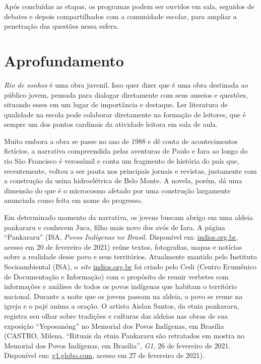 \documentclass[12pt]{extarticle}
\begin{document}
  Após concluídas as etapas, os programas podem ser ouvidos em sala,
  seguidos de debates e depois compartilhados com a comunidade escolar,
  para ampliar a penetração das questões nessa esfera.

  \section{Aprofundamento}

  \emph{Rio de sonhos} é uma obra juvenil. Isso quer dizer que é uma
  obra destinada ao público jovem, pensada para dialogar diretamente com
  seus anseios e questões, situando esses em um lugar de importância e
  destaque. Ler literatura de qualidade na escola pode colaborar
  diretamente na formação de leitores, que é sempre um dos pontos
  cardinais da atividade leitora em sala de aula.

  Muito embora a obra se passe no ano de 1988 e dê conta de
  acontecimentos fictícios, a narrativa compreendida pelas aventuras de
  Paulo e Iara ao longo do rio São Francisco é verossímil e conta um
  fragmento de história do país que, recentemente, voltou a ser pauta
  nos principais jornais e revistas, justamente com a construção da
  usina hidroelétrica de Belo Monte. A novela, porém, dá uma dimensão do
  que é o microcosmo afetado por uma construção largamente anunciada
  como feita em nome do progresso.

  Em determinado momento da narrativa, os jovens buscam abrigo em uma
  aldeia pankararu e conhecem Juca, filho mais novo dos avós de Iara. A
  página ``Pankararu'' (ISA, \emph{Povos Indígenas no Brasil.}
  Disponível em:
  \href{https://www.indios.org.br/pt/Povo:Pankararu}{indios.org.br},
  acesso em 20 de fevereiro de 2021) reúne textos, fotografias, mapas e
  notícias sobre a realidade desse povo e seus territórios. Atualmente
  mantido pelo Instituto Socioambiental (ISA), o \emph{site}
  \href{https://www.indios.org.br/}{indios.org.br}
  foi criado pelo Cedi (Centro Ecumênico de Documentação e Informação)
  com o propósito de reunir verbetes com informações e análises de todos
  os povos indígenas que habitam o território nacional. Durante a noite
  que os jovens passam na aldeia, o povo se reune na igreja e o pajé
  anima a oração. O artista Aislan Santos, da etnia pankararu, registra
  seu olhar sobre tradições e culturas das aldeias nas obras de sua
  exposição ``Yeposanóng'' no Memorial dos Povos Indígenas, em Brasília
  (CASTRO, Milena. ``Rituais da etnia Pankararu são retratados em mostra
  no Memorial dos Povos Indígenas, em Brasília'', \emph{G1}, 26 de
  fevereiro de 2021. Disponível em:
 \href{https://g1.globo.com/google/amp/df/distrito-federal/o-que-fazer-no-distrito-federal/noticia/2021/02/26/rituais-da-etnia-pankararu-sao-retratados-em-mostra-no-memorial-dos-povos-indigenas-em-brasilia.ghtml}{g1.globo.com},
  acesso em 27 de fevereiro de 2021).
\end{document}
